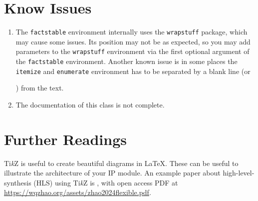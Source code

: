 \documentclass{ip-doc}
\begin{document}
\section{Know Issues}
\begin{enumerate}
  \item The \texttt{factstable} environment internally uses the \texttt{wrapstuff} package, which may cause some issues.
  Its position may not be as expected, so you may add parameters to the \texttt{wrapstuff} environment via the first optional argument of the \texttt{factstable} environment.
  Another known issue is in some places the \texttt{itemize} and \texttt{enumerate} environment has to be separated by a blank line (or {\ttfamily\string\par\relax}) from the text.
  \item The documentation of this class is not complete.
\end{enumerate}

\section{Further Readings}
Ti\textit{k}Z is useful to create beautiful diagrams in \LaTeX.
These can be useful to illustrate the architecture of your IP module.
An example paper about high-level-synthesis (HLS) using Ti\textit{k}Z is \cite{zhao2024flexible},
with open access PDF at \url{https://wqzhao.org/assets/zhao2024flexible.pdf}.


{\small}
\end{document}
